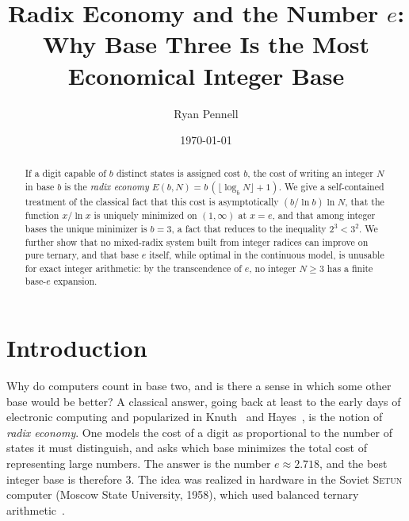 \documentclass[11pt]{amsart}
\theoremstyle{definition}
\theoremstyle{remark}
\numberwithin{equation}{section}
\begin{document}
\title[Radix Economy and the Number e]{Radix Economy and the Number $e$:\\ Why Base Three Is the Most Economical Integer Base}

\author{Ryan Pennell}
\address{Department of Mathematics, Ivy Tech Community College, Bloomington, Indiana}


\date{\today}

\begin{abstract}
If a digit capable of $b$ distinct states is assigned cost $b$, the cost of
writing an integer $N$ in base $b$ is the \emph{radix economy}
$E(b,N) = b\,(\lfloor \log_b N\rfloor + 1)$. We give a self-contained
treatment of the classical fact that this cost is asymptotically
$(b/\ln b)\ln N$, that the function $x/\ln x$ is uniquely minimized on
$(1,\infty)$ at $x=e$, and that among integer bases the unique minimizer is
$b=3$, a fact that reduces to the inequality $2^3<3^2$. We further show that
no mixed-radix system built from integer radices can improve on pure ternary,
and that base $e$ itself, while optimal in the continuous model, is unusable
for exact integer arithmetic: by the transcendence of $e$, no integer
$N\ge 3$ has a finite base-$e$ expansion.
\end{abstract}

\maketitle

\section{Introduction}

Why do computers count in base two, and is there a sense in which some other
base would be better? A classical answer, going back at least to the early
days of electronic computing and popularized in Knuth~\cite{knuth} and
Hayes~\cite{hayes}, is the notion of \emph{radix economy}. One models the
cost of a digit as proportional to the number of states it must distinguish,
and asks which base minimizes the total cost of representing large numbers.
The answer is the number $e\approx 2.718$, and the best integer base is
therefore $3$. The idea was realized in hardware in the Soviet
\textsc{Setun} computer (Moscow State University, 1958), which used balanced
ternary arithmetic~\cite{hayes}.
\end{document}
